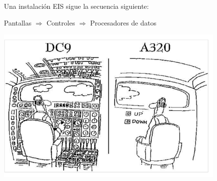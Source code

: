 \begin{frame}
  Una instalaci\'on EIS sigue la secuencia siguiente:

\vspace{3mm}


 Pantallas \qquad $\Longrightarrow$ \qquad
 Controles  \qquad $\Longrightarrow$ \qquad
 Procesadores de datos 

\includegraphics[width=0.85\textwidth]{imagenes/1.4.pantalla.electronica/efis_humor.png}

\end{frame}

